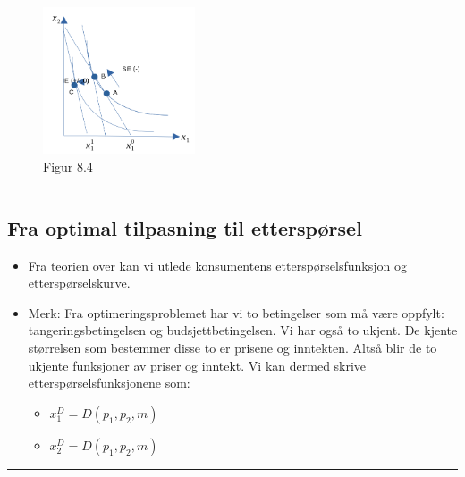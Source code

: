 \documentclass[
  letterpaper,
  DIV=11,
  numbers=noendperiod]{scrartcl}
\providecommand{\tightlist}{%
  \setlength{\itemsep}{0pt}\setlength{\parskip}{0pt}}\usepackage{longtable,booktabs,array}
\begin{document}
\begin{figure}[H]

{\centering \includegraphics[width=0.4\textwidth,height=\textheight]{drawio/utletter.png}

}

\caption{Figur 8.4}

\end{figure}%

\begin{center}\rule{0.5\linewidth}{0.5pt}\end{center}

\subsection{Fra optimal tilpasning til
etterspørsel}\label{fra-optimal-tilpasning-til-etterspuxf8rsel}

\begin{itemize}
\tightlist
\item
  Fra teorien over kan vi utlede konsumentens etterspørselsfunksjon og
  etterspørselskurve.
\item
  Merk: Fra optimeringsproblemet har vi to betingelser som må være
  oppfylt: tangeringsbetingelsen og budsjettbetingelsen. Vi har også to
  ukjent. De kjente størrelsen som bestemmer disse to er prisene og
  inntekten. Altså blir de to ukjente funksjoner av priser og inntekt.
  Vi kan dermed skrive etterspørselsfunksjonene som:

  \begin{itemize}
  \tightlist
  \item
    \(x_1^D=D(p_1,p_2,m)\)
  \item
    \(x_2^D=D(p_1,p_2,m)\)
  \end{itemize}
\end{itemize}

\begin{center}\rule{0.5\linewidth}{0.5pt}\end{center}
\end{document}
